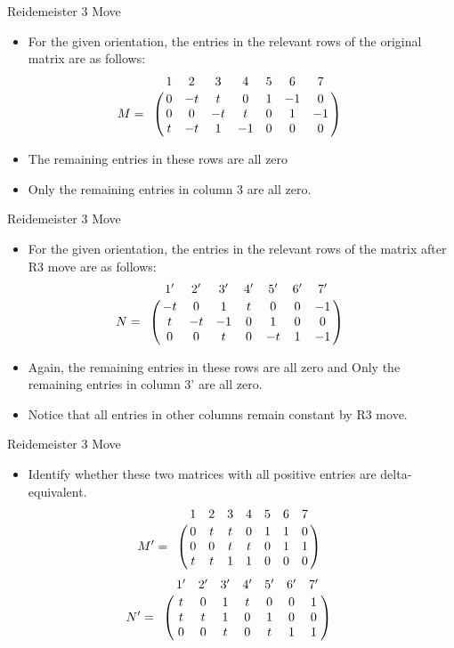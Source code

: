 \documentclass[10pt]{beamer}
\begin{document}
\begin{frame} {Reidemeister 3 Move}
  \begin{itemize}
  \item For the given orientation, the entries in the relevant rows of the original matrix are as follows:
  \[
  M=
  \bordermatrix{ & 1 & 2 & 3 & 4 & 5 & 6 & 7 \cr
  & 0 & -t & t & 0 & 1 & -1 & 0  \cr
  & 0 & 0 & -t & t & 0 & 1 & -1  \cr
  & t & -t & 1 & -1 & 0 & 0 & 0
 } \qquad
  \]
  \item The remaining entries in these rows are all zero
  \item Only the remaining entries in column 3 are all zero.
  \end{itemize}
\end{frame}

\begin{frame} {Reidemeister 3 Move}
  \begin{itemize}
  \item For the given orientation, the entries in the relevant rows of the matrix after R3 move are as follows: 
  \[
  N=
  \bordermatrix{ & 1' & 2' & 3' & 4' & 5' & 6' & 7' \cr
  & -t & 0 & 1 & t & 0 & 0 & -1  \cr
  & t & -t & -1 & 0 & 1 & 0 & 0  \cr
  & 0 & 0 & t & 0 & -t & 1 & -1
 } \qquad
  \]
  \item Again, the remaining entries in these rows are all zero and Only the remaining entries in column 3' are all zero.
  \item Notice that all entries in other columns remain constant by R3 move.
  \end{itemize}
\end{frame}

\begin{frame} {Reidemeister 3 Move}
  \begin{itemize}
  \item Identify whether these two matrices with all positive entries are delta-equivalent.
  \[
  M'=
  \bordermatrix{ & 1 & 2 & 3 & 4 & 5 & 6 & 7 \cr
  & 0 & t & t & 0 & 1 & 1 & 0  \cr
  & 0 & 0 & t & t & 0 & 1 & 1  \cr
  & t & t & 1 & 1 & 0 & 0 & 0
 } \qquad
  \]
 \[
  N'=
  \bordermatrix{ & 1' & 2' & 3' & 4' & 5' & 6' & 7' \cr
  & t & 0 & 1 & t & 0 & 0 & 1  \cr
  & t & t & 1 & 0 & 1 & 0 & 0  \cr
  & 0 & 0 & t & 0 & t & 1 & 1
 } \qquad
  \]

  \end{itemize}
\end{frame}
\end{document}
